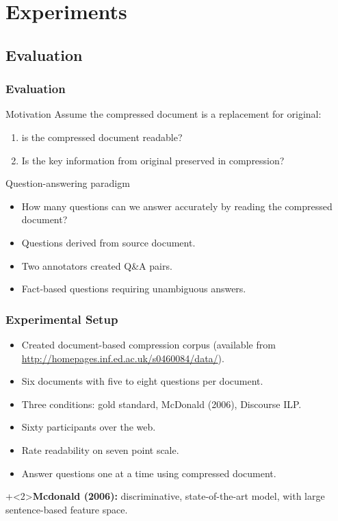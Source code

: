\documentclass{beamer}
\begin{document}

\section{Experiments}

\subsection{Evaluation}

\begin{frame}
  \frametitle{Evaluation} 
\begin{block}{Motivation}
Assume the compressed document is a replacement for original:
  \begin{enumerate}
  \item is the compressed document readable?
  \item Is the key information from original preserved in
    compression?
  \end{enumerate}
\end{block}

  \begin{block}{Question-answering paradigm}
  \begin{itemize}
  \item How many questions can we answer accurately by reading
    the compressed document? 
 \item  Questions derived from source document.
  \item Two annotators created Q\&A pairs. 
  \item Fact-based questions requiring unambiguous answers.
  \end{itemize}
\end{block}
\end{frame}


\begin{frame}
  \frametitle{Experimental Setup}
  \begin{itemize}
  \item Created document-based compression corpus (available from 
    \url{http://homepages.inf.ed.ac.uk/s0460084/data/}). 
  \item Six documents with five to eight questions per document.
  \item Three conditions: gold standard, McDonald (2006), Discourse ILP.
  \item Sixty participants over the web.
  \item Rate readability on seven point scale.
  \item Answer questions one at a time using  compressed   document.
  \end{itemize}

\vspace{.5em}
\onslide+<2>{\textbf{Mcdonald (2006):} discriminative,
  state-of-the-art model, with  large sentence-based feature space.} 
\end{frame}
\end{document}
